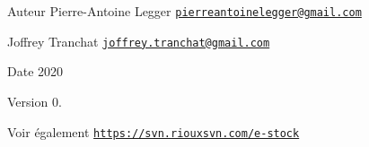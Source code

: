 \begin{DoxyAuthor}{Auteur}
Pierre-\/\+Antoine Legger \href{mailto:pierreantoinelegger@gmail.com}{\tt pierreantoinelegger@gmail.\+com} 

Joffrey Tranchat \href{mailto:joffrey.tranchat@gmail.com}{\tt joffrey.\+tranchat@gmail.\+com} 
\end{DoxyAuthor}
\begin{DoxyDate}{Date}
2020 
\end{DoxyDate}
\begin{DoxyVersion}{Version}
0. 
\end{DoxyVersion}
\begin{DoxySeeAlso}{Voir également}
\href{https://svn.riouxsvn.com/e-stock}{\tt https\+://svn.\+riouxsvn.\+com/e-\/stock} 
\end{DoxySeeAlso}
